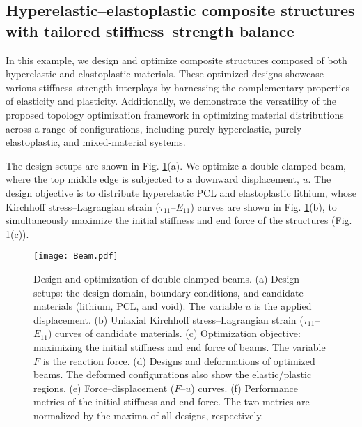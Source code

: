 \documentclass[preprint,11pt]{elsarticle}
\theoremstyle{definition}
\begin{document}
\subsection{Hyperelastic--elastoplastic composite structures with tailored stiffness--strength balance}

In this example, we design and optimize composite structures composed of both hyperelastic and elastoplastic materials. These optimized designs showcase various stiffness--strength interplays by harnessing the complementary properties of elasticity and plasticity. Additionally, we demonstrate the versatility of the proposed topology optimization framework in optimizing material distributions across a range of configurations, including purely hyperelastic, purely elastoplastic, and mixed-material systems.

The design setups are shown in Fig. \ref{Fig: Beam}(a). We optimize a double-clamped beam, where the top middle edge is subjected to a downward displacement, $u$. The design objective is to distribute hyperelastic PCL and elastoplastic lithium, whose Kirchhoff stress--Lagrangian strain ($\tau_{11}$--$E_{11}$) curves are shown in Fig. \ref{Fig: Beam}(b), to simultaneously maximize the initial stiffness and end force of the structures (Fig. \ref{Fig: Beam}(c)).

\begin{figure}[!htbp]
    \centering
    \texttt{[image: Beam.pdf]}
    \caption{Design and optimization of double-clamped beams. (a) Design setups: the design domain, boundary conditions, and candidate materials (lithium, PCL, and void). The variable $u$ is the applied displacement. (b) Uniaxial Kirchhoff stress--Lagrangian strain ($\tau_{11}$--$E_{11}$) curves of candidate materials. (c) Optimization objective: maximizing the initial stiffness and end force of beams. The variable $F$ is the reaction force. (d) Designs and deformations of optimized beams. The deformed configurations also show the elastic/plastic regions. (e) Force--displacement ($F$--$u$) curves. (f) Performance metrics of the initial stiffness and end force. The two metrics are normalized by the maxima of all designs, respectively.}
    \label{Fig: Beam}
\end{figure}
\end{document}
